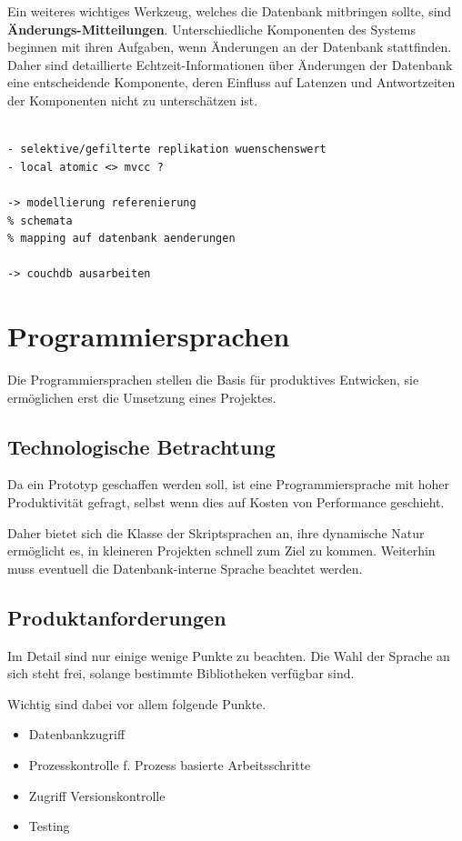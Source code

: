 Ein weiteres wichtiges Werkzeug, welches die Datenbank mitbringen sollte, sind \textbf{Änderungs-Mitteilungen}.
Unterschiedliche Komponenten des Systems beginnen mit ihren Aufgaben,
wenn \"Anderungen an der Datenbank stattfinden.
Daher sind detaillierte Echtzeit-Informationen über Änderungen der Datenbank eine entscheidende Komponente,
deren Einfluss auf Latenzen und Antwortzeiten der Komponenten nicht zu unterschätzen ist.


\begin{verbatim}

- selektive/gefilterte replikation wuenschenswert
- local atomic <> mvcc ?

-> modellierung referenierung
% schemata
% mapping auf datenbank aenderungen

-> couchdb ausarbeiten

\end{verbatim}


\section{Programmiersprachen}

Die Programmiersprachen stellen die Basis f\"ur produktives Entwicken,
sie erm\"oglichen erst die Umsetzung eines Projektes.

\subsection{Technologische Betrachtung}

Da ein Prototyp geschaffen werden soll,
ist eine Programmiersprache mit hoher Produktivit\"at gefragt,
selbst wenn dies auf Kosten von Performance geschieht.

Daher bietet sich die Klasse der Skriptsprachen an,
ihre dynamische Natur ermöglicht es,
in kleineren Projekten schnell zum Ziel zu kommen.
Weiterhin muss eventuell die Datenbank-interne Sprache beachtet werden.


\subsection{Produktanforderungen}

Im Detail sind nur einige wenige Punkte zu beachten.
Die Wahl der Sprache an sich steht frei,
solange bestimmte Bibliotheken verf\"ugbar sind.

Wichtig sind dabei vor allem folgende Punkte.
\begin{itemize}
    \item Datenbankzugriff 
    \item Prozesskontrolle f. Prozess basierte Arbeitsschritte
    \item Zugriff Versionskontrolle
    \item Testing
\end{itemize}

